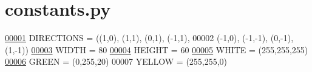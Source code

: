 \hypertarget{constants_8py_source}{\section{constants.\+py}
}

\begin{DoxyCode}
\hypertarget{constants_8py_source_l00001}{}\hyperlink{namespaceconstants_ac910045b50610ec197515a3635d8d037}{00001} DIRECTIONS = ((1,0), (1,1), (0,1), (-1,1),
00002     (-1,0), (-1,-1), (0,-1), (1,-1))
\hypertarget{constants_8py_source_l00003}{}\hyperlink{namespaceconstants_aa1f49ae50d4547cd3b9f4801d04f5830}{00003} WIDTH = 80
\hypertarget{constants_8py_source_l00004}{}\hyperlink{namespaceconstants_a581305cb095bf2d8826a12abef66a15e}{00004} HEIGHT = 60
\hypertarget{constants_8py_source_l00005}{}\hyperlink{namespaceconstants_ab7ba6a498f408091781f6f90a0446bcc}{00005} WHITE = (255,255,255)
\hypertarget{constants_8py_source_l00006}{}\hyperlink{namespaceconstants_a71ba084102da630a352232ea121e0e95}{00006} GREEN = (0,255,20)
00007 YELLOW = (255,255,0)
\end{DoxyCode}
